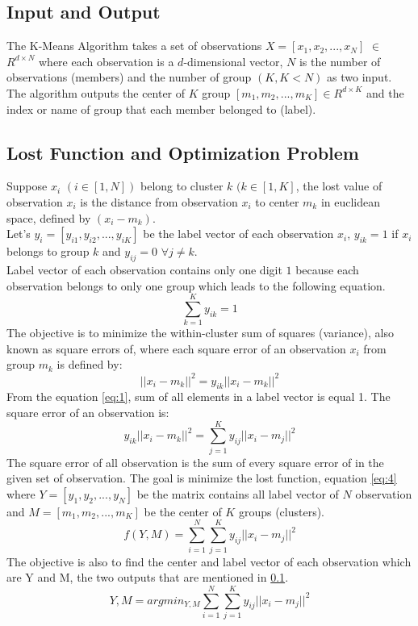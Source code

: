 \documentclass[conference]{IEEEtran}
\begin{document}
\subsection{Input and Output} \label{input_output}
The K-Means Algorithm takes a set of observations $X=[x_1,x_2,...,x_N]$ $\in$ $R^{d \times N}$ where each observation is a $d$-dimensional vector, $N$ is the number of observations (members) and the number of group $(K, K<N)$ as two input. The algorithm outputs the center of $K$ group $[m_1,m_2,...,m_K] \in R^{d \times K}$ and the index or name of group that each member belonged to (label).
\subsection{Lost Function and Optimization Problem}
Suppose $x_i$ $(i\in[1,N])$ belong to cluster $k$ $(k \in [1,K]$, the lost value of observation $x_i$ is the distance from observation $x_i$ to center $m_k$ in euclidean space, defined by $(x_i-m_k)$.\\
Let's $y_i=[y_{i1},y_{i2},...,y_{iK}]$ be the label vector of each observation $x_i$, $y_{ik}=1$ if $x_i$ belongs to group $k$ and $y_{ij}=0$ $\forall j\neq k$.\\
\indent Label vector of each observation contains only one digit $1$ because each observation belongs to only one group which leads to the following equation.\\
\begin{equation} \label{eq:1}
\sum_{k=1}^{K} y_{ik} = 1
\end{equation}
\indent The objective is to minimize the within-cluster sum of squares (variance), also known as square errors of, where each square error of an observation $x_i$ from group $m_k$ is defined by:
\begin{equation} \label{eq:2}
||x_{i}-m_{k}||^2=y_{ik}||x_{i}-{m_k}||^2
\end{equation}
\indent From the equation \ref{eq:1}, sum of all elements in a label vector is equal 1. The square error of an observation is:
\begin{equation} \label{eq:3}
y_{ik}||x_{i}-{m_k}||^2=\sum_{j=1}^{K}y_{ij}||x_{i}-m_{j}||^2
\end{equation}
\indent The square error of all observation is the sum of every square error of in the given set of observation. The goal is minimize the lost function, equation \ref{eq:4} where $Y=[y_1,y_2,...,y_N]$ be the matrix contains all label vector of $N$ observation and $M=[m_1,m_2,...,m_K]$ be the center of $K$ groups (clusters).
\begin{equation} \label{eq:4}
f(Y,M)=\sum_{i=1}^{N}\sum_{j=1}^{K}y_{ij}||x_i-m_j||^2
\end{equation}
\indent The objective is also to find the center and label vector of each observation which are Y and M, the two outputs that are mentioned in \ref{input_output}. 
\begin{equation} \label{eq:5}
Y,M=argmin_{Y,M}\sum_{i=1}^{N}\sum_{j=1}^{K}y_{ij}||x_i-m_j||^2 
\end{equation}
\end{document}
